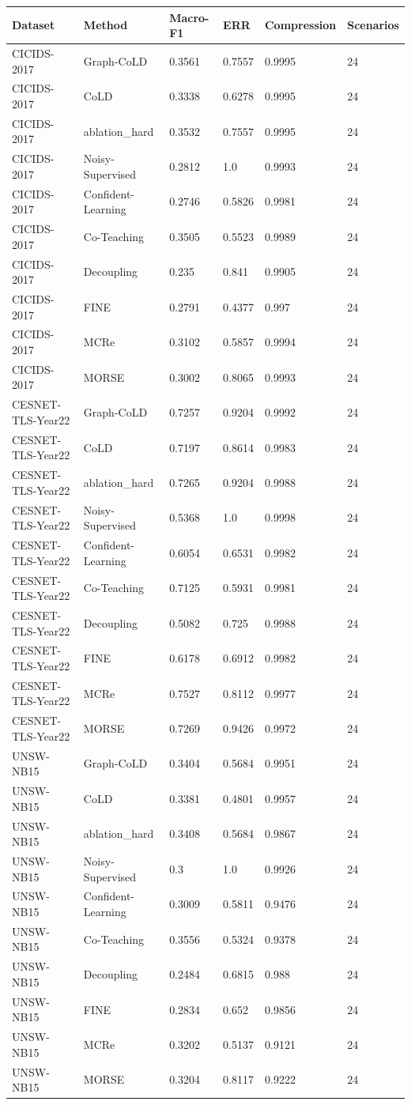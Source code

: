 \small
\begin{tabular}{llllll}
\hline
Dataset & Method & Macro-F1 & ERR & Compression & Scenarios \\
\hline
CICIDS-2017 & Graph-CoLD & 0.3561 & 0.7557 & 0.9995 & 24 \\
CICIDS-2017 & CoLD & 0.3338 & 0.6278 & 0.9995 & 24 \\
CICIDS-2017 & ablation\_hard & 0.3532 & 0.7557 & 0.9995 & 24 \\
CICIDS-2017 & Noisy-Supervised & 0.2812 & 1.0 & 0.9993 & 24 \\
CICIDS-2017 & Confident-Learning & 0.2746 & 0.5826 & 0.9981 & 24 \\
CICIDS-2017 & Co-Teaching & 0.3505 & 0.5523 & 0.9989 & 24 \\
CICIDS-2017 & Decoupling & 0.235 & 0.841 & 0.9905 & 24 \\
CICIDS-2017 & FINE & 0.2791 & 0.4377 & 0.997 & 24 \\
CICIDS-2017 & MCRe & 0.3102 & 0.5857 & 0.9994 & 24 \\
CICIDS-2017 & MORSE & 0.3002 & 0.8065 & 0.9993 & 24 \\
CESNET-TLS-Year22 & Graph-CoLD & 0.7257 & 0.9204 & 0.9992 & 24 \\
CESNET-TLS-Year22 & CoLD & 0.7197 & 0.8614 & 0.9983 & 24 \\
CESNET-TLS-Year22 & ablation\_hard & 0.7265 & 0.9204 & 0.9988 & 24 \\
CESNET-TLS-Year22 & Noisy-Supervised & 0.5368 & 1.0 & 0.9998 & 24 \\
CESNET-TLS-Year22 & Confident-Learning & 0.6054 & 0.6531 & 0.9982 & 24 \\
CESNET-TLS-Year22 & Co-Teaching & 0.7125 & 0.5931 & 0.9981 & 24 \\
CESNET-TLS-Year22 & Decoupling & 0.5082 & 0.725 & 0.9988 & 24 \\
CESNET-TLS-Year22 & FINE & 0.6178 & 0.6912 & 0.9982 & 24 \\
CESNET-TLS-Year22 & MCRe & 0.7527 & 0.8112 & 0.9977 & 24 \\
CESNET-TLS-Year22 & MORSE & 0.7269 & 0.9426 & 0.9972 & 24 \\
UNSW-NB15 & Graph-CoLD & 0.3404 & 0.5684 & 0.9951 & 24 \\
UNSW-NB15 & CoLD & 0.3381 & 0.4801 & 0.9957 & 24 \\
UNSW-NB15 & ablation\_hard & 0.3408 & 0.5684 & 0.9867 & 24 \\
UNSW-NB15 & Noisy-Supervised & 0.3 & 1.0 & 0.9926 & 24 \\
UNSW-NB15 & Confident-Learning & 0.3009 & 0.5811 & 0.9476 & 24 \\
UNSW-NB15 & Co-Teaching & 0.3556 & 0.5324 & 0.9378 & 24 \\
UNSW-NB15 & Decoupling & 0.2484 & 0.6815 & 0.988 & 24 \\
UNSW-NB15 & FINE & 0.2834 & 0.652 & 0.9856 & 24 \\
UNSW-NB15 & MCRe & 0.3202 & 0.5137 & 0.9121 & 24 \\
UNSW-NB15 & MORSE & 0.3204 & 0.8117 & 0.9222 & 24 \\
\hline
\end{tabular}
